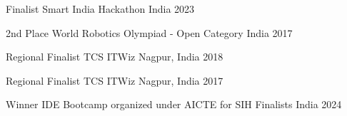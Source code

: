 \documentclass[11pt, a4paper]{awesome-cv}
\begin{document}


\begin{cvhonors}

  \cvhonor
    {Finalist} %
    {Smart India Hackathon} %
    {India} %
    {2023} %

  \cvhonor
    {2nd Place} %
    {World Robotics Olympiad - Open Category} %
    {India} %
    {2017} %

  \cvhonor
    {Regional Finalist} %
    {TCS ITWiz} %
    {Nagpur, India} %
    {2018} %

  \cvhonor
    {Regional Finalist} %
    {TCS ITWiz} %
    {Nagpur, India} %
    {2017} %

\end{cvhonors}




\begin{cvhonors}

  \cvhonor
    {Winner} %
    {IDE Bootcamp organized under AICTE for SIH Finalists} %
    {India} %
    {2024} %

\end{cvhonors}

\end{document}
